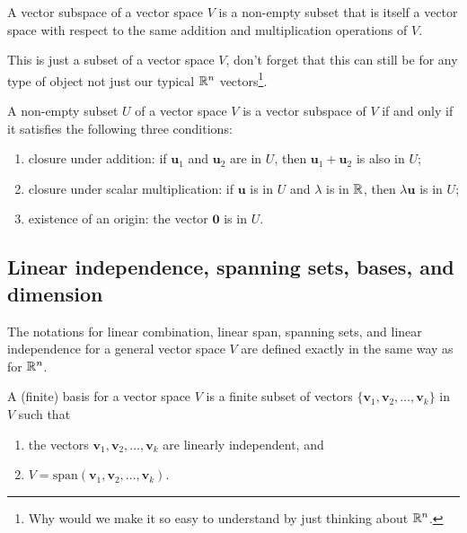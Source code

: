 \documentclass[10pt, a4paper]{article}
\newcommand{\mbf}[1]{\mathbf{#1}}
\begin{document}
\begin{definition}
    A vector subspace of a vector space $V$ is a non-empty subset that is itself a vector space with respect to the same addition and multiplication operations of $V$.
\end{definition}
This is just a subset of a vector space $V$,
don't forget that this can still be for any type of object not just our typical $\mathbb{R} ^ n$ vectors\footnote{Why would we make it so easy to understand by just thinking about $\mathbb{R} ^ n$.}.

\begin{proposition}
    A non-empty subset $U$ of a vector space $V$ is a vector subspace of $V$ if and only if it satisfies the following three conditions:
    \begin{enumerate}[label = (\roman*)]
        \item closure under addition:
        if $\mbf{u}_1$ and $\mbf{u}_2$ are in $U$,
        then $\mbf{u}_1 + \mbf{u}_2$ is also in $U$;
        \item closure under scalar multiplication:
        if $\mbf{u}$ is in $U$ and $\lambda$ is in $\mathbb{R}$,
        then $\lambda\mbf{u}$ is in $U$;
        \item existence of an origin:
        the vector $\mbf{0}$ is in $U$.
    \end{enumerate}
\end{proposition}

\subsection{Linear independence, spanning sets, bases, and dimension}
The notations for linear combination, linear span, spanning sets, and linear independence for a general vector space $V$ are defined exactly in the same way as for $\mathbb{R} ^ n$.
\begin{definition}[Basis]
    A (finite) basis for a vector space $V$ is a finite subset of vectors $\{\mbf{v}_1, \mbf{v}_2, \dotsc, \mbf{v}_k\}$ in $V$ such that
    \begin{enumerate}[label = (\roman*)]
        \item the vectors $\mbf{v}_1, \mbf{v}_2, \dotsc, \mbf{v}_k$ are linearly independent,
        and
        \item $V = \mathrm{span}(\mbf{v}_1, \mbf{v}_2, \dotsc, \mbf{v}_k)$.
    \end{enumerate}
\end{definition}
\end{document}
